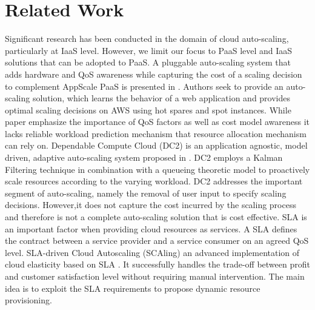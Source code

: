 \section{Related Work}
Significant research has been conducted in the domain of cloud auto-scaling, particularly at IaaS level. However, we limit our focus to PaaS level and IaaS solutions that can be adopted to PaaS. A pluggable auto-scaling system that adds hardware and QoS awareness while capturing the cost of a scaling decision to complement AppScale PaaS is presented in \cite{pluggable}. Authors seek to provide an auto-scaling solution, which learns the behavior of a web application and provides optimal scaling decisions on AWS using hot spares and spot instances.
While paper emphasize the importance of QoS factors as well as cost model awareness it lacks reliable workload prediction mechanism that resource allocation mechanism can rely on. Dependable Compute Cloud (DC2) is an application agnostic, model driven, adaptive auto-scaling system proposed in \cite{modeldriven}. DC2 employs a Kalman Filtering technique in combination with a queueing theoretic model to proactively scale resources according to the varying workload. DC2 addresses the important segment of auto-scaling, namely the removal of user input to specify scaling decisions. However,it does not capture the cost incurred by the scaling process and therefore is not a complete auto-scaling solution that is cost effective. SLA is an important factor when providing cloud resources as services. A SLA defines the contract between a service provider and a service consumer on an agreed QoS level. SLA-driven Cloud Autoscaling (SCAling) an advanced implementation of cloud elasticity based on SLA \cite{sladriven}. It successfully handles the trade-off between profit and customer satisfaction level without requiring manual intervention. The main idea is to exploit the SLA requirements to propose dynamic resource provisioning.\\

